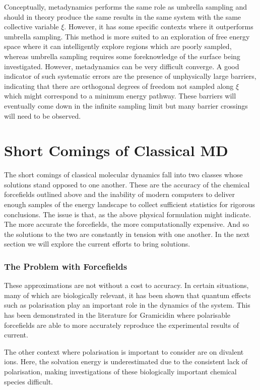 Conceptually, metadynamics performs the same role as umbrella sampling and should in theory produce the same results in the same system with the same collective variable $\xi$. However, it has some specific contexts where it outperforms umbrella sampling. This method is more suited to an exploration of free energy space where it can intelligently explore regions which are poorly sampled, whereas umbrella sampling requires some foreknowledge of the surface being investigated. However, metadynamics can be very difficult converge. A good indicator of such systematic errors are the presence of unphysically large barriers, indicating that there are orthogonal degrees of freedom not sampled along $\xi$ which might correspond to a minimum energy pathway. These barriers will eventually come down in the infinite sampling limit but many barrier crossings will need to be observed. 

\section{Short Comings of Classical MD}
The short comings of classical molecular dynamics fall into two classes whose solutions stand opposed to one another. These are the accuracy of the chemical forcefields outlined above and the inability of modern computers to deliver enough samples of the energy landscape to collect sufficient statistics for rigorous conclusions. The issue is that, as the above physical formulation might indicate. The more accurate the forcefields, the more computationally expensive. And so the solutions to the two are constantly in tension with one another. In the next section we will explore the current efforts to bring solutions.

\subsubsection{The Problem with Forcefields}
These approximations are not without a cost to accuracy. In certain situations, many of which are biologically relevant, it has been shown that quantum effects such as polarisation play an important role in the dynamics of the system. This has been demonstrated in the literature for Gramicidin where polarisable forcefields are able to more accurately reproduce the experimental results of current.

The other context where polarisation is important to consider are on divalent ions. Here, the solvation energy is underestimated due to the consistent lack of polarisation, making investigations of these biologically important chemical species difficult.

